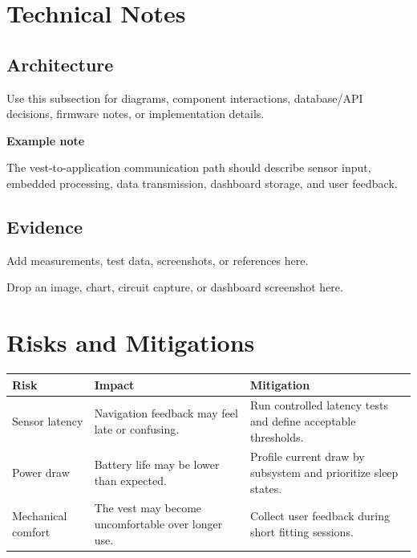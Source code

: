 \documentclass[11pt,a4paper]{article}
\newcommand{\DisplayFont}{\sffamily}
\newcommand{\NaviSectionNote}[2]{%
  \vspace{2pt}
  {\DisplayFont\bfseries\color{NaviCyan}#1}\par
  {\color{NaviMuted}#2}
  \vspace{4pt}
}
\begin{document}
\section{Technical Notes}
\subsection{Architecture}
Use this subsection for diagrams, component interactions, database/API decisions, firmware
notes, or implementation details.

\NaviSectionNote{Example note}{The vest-to-application communication path should describe
sensor input, embedded processing, data transmission, dashboard storage, and user feedback.}

\subsection{Evidence}
Add measurements, test data, screenshots, or references here.

\begin{center}
\begin{tcolorbox}[
  enhanced,
  width=0.78\textwidth,
  height=42mm,
  colback=NaviCardSoft!58,
  colframe=NaviCyan!14,
  boxrule=0.38pt,
  arc=8pt,
  valign=center,
  halign=center,
  borderline north={0.3pt}{0pt}{white!9}
]
{\color{NaviMuted}Drop an image, chart, circuit capture, or dashboard screenshot here.}
\end{tcolorbox}
\end{center}

\section{Risks and Mitigations}
\begin{tabularx}{\textwidth}{|B{0.23\textwidth}|Y|Y|}
\hline
{\bfseries\color{NaviCyan}Risk} & {\bfseries\color{NaviCyan}Impact} & {\bfseries\color{NaviCyan}Mitigation} \\
\hline
Sensor latency & Navigation feedback may feel late or confusing. & Run controlled latency tests and define acceptable thresholds. \\
\hline
Power draw & Battery life may be lower than expected. & Profile current draw by subsystem and prioritize sleep states. \\
\hline
Mechanical comfort & The vest may become uncomfortable over longer use. & Collect user feedback during short fitting sessions. \\
\hline
\end{tabularx}
\end{document}
